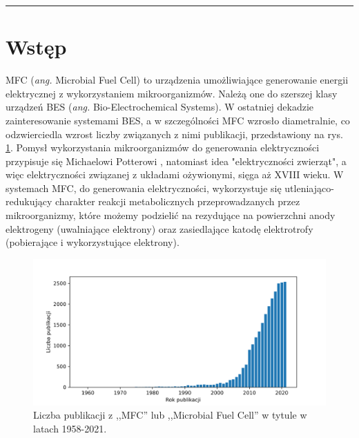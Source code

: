 \documentclass[12pt, a4paper]{article}
\begin{document}


\newpage


\tableofcontents

\begin{abstract}
    \noindent
    \lipsum[1]
\end{abstract}

\rule{\textwidth}{0.4pt}

\begin{otherlanguage}{british}
    \begin{abstract}
        \noindent
        \lipsum[1] 
    \end{abstract}
\end{otherlanguage}

\section{Wstęp}
MFC (\textit{ang.} Microbial Fuel Cell) to urządzenia umożliwiające generowanie energii elektrycznej z wykorzystaniem mikroorganizmów. Należą one do szerszej klasy urządzeń BES (\textit{ang.} Bio-Electrochemical Systems). W ostatniej dekadzie zainteresowanie systemami BES, a w szczególności MFC wzrosło diametralnie, co odzwierciedla wzrost liczby związanych z nimi publikacji, przedstawiony na rys. \ref{fig:1}. Pomysł wykorzystania mikroorganizmów do generowania elektryczności przypisuje się Michaelowi Potterowi \cite{Potter1911}, natomiast idea "elektryczności zwierząt", a więc elektryczności związanej z układami ożywionymi, sięga aż XVIII wieku. W systemach MFC, do generowania elektryczności, wykorzystuje się utleniająco-redukujący charakter reakcji metabolicznych przeprowadzanych przez mikroorganizmy, które możemy podzielić na rezydujące na powierzchni anody elektrogeny (uwalniające elektrony) oraz zasiedlające katodę elektrotrofy (pobierające i wykorzystujące elektrony).

\begin{figure}[!b]
    \centering
    \includegraphics[width=\textwidth]{figures/pub.png}
    \caption{Liczba publikacji z ,,MFC'' lub ,,Microbial Fuel Cell'' w tytule w latach 1958-2021.}
    \label{fig:1}
\end{figure}
\end{document}
